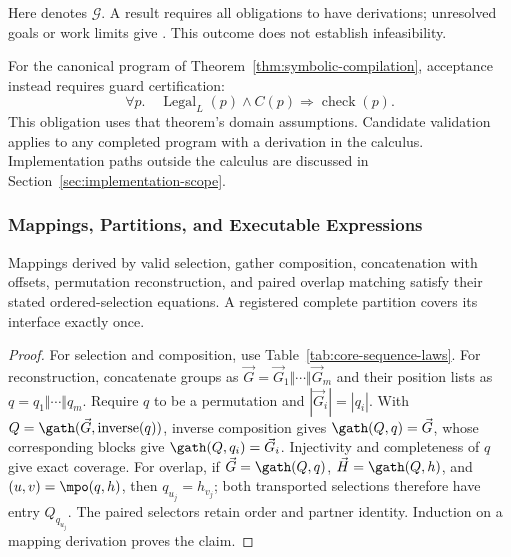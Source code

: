 Here  denotes $\mathcal G$. A  result requires
all obligations to have derivations; unresolved goals or work limits give
. This outcome does not establish infeasibility.

For the canonical program of Theorem~\ref{thm:symbolic-compilation},
acceptance instead requires guard certification:
\begin{equation}
 \forall p.\quad \operatorname{Legal}_L(p)\land C(p)
 \Rightarrow\operatorname{check}(p).
 \label{eq:guard-feasibility}
\end{equation}
This obligation uses that theorem's domain assumptions. Candidate
validation applies to any completed program with a derivation in the
calculus. Implementation paths outside the calculus are discussed in
Section~\ref{sec:implementation-scope}.

\subsubsection{Mappings, Partitions, and Executable Expressions}
\begin{lemma}
\label{lem:validated-mappings}
Mappings derived by valid selection, gather composition, concatenation
with offsets, permutation reconstruction, and paired overlap matching
satisfy their stated ordered-selection equations. A registered complete
partition covers its interface exactly once.
\end{lemma}
\begin{proof}
For selection and composition, use Table~\ref{tab:core-sequence-laws}.
For reconstruction, concatenate groups as $\vec G=\vec G_1\Vert\cdots\Vert \vec G_m$
and their position lists as $q=q_1\Vert\cdots\Vert q_m$. Require $q$ to
be a permutation and $|\vec G_i|=|q_i|$. With
$Q=\gath(\vec G,\operatorname{inverse}(q))$, inverse composition gives
$\gath(Q,q)=\vec G$, whose corresponding blocks give
$\gath(Q,q_i)=\vec G_i$. Injectivity and completeness of $q$ give exact coverage.
For overlap, if $\vec G=\gath(Q,q)$, $\vec H=\gath(Q,h)$, and
$(u,v)=\mpo(q,h)$, then $q_{u_j}=h_{v_j}$; both transported selections
therefore have entry $Q_{q_{u_j}}$. The paired selectors retain order and
partner identity. Induction on a mapping derivation proves the claim.
\end{proof}

